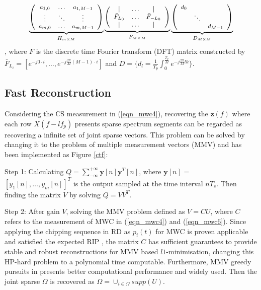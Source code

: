 \begin{align}
\label{eqn_mwc6}
\underbrace{\left(\footnotesize
\begin{array}[c]{ccc}
a_{1,0}&\ldots &a_{1,M-1} \\
\vdots &\ddots & \vdots \\
a_{m,0}&\ldots &a_{m,M-1}
\end{array}\right)}_{H_{m \times M}}
\underbrace{\left(\small
\begin{array}[c]{ccc}
| & \ldots & | \\
\bar F_{L_0} & \ldots &  \bar F_{-L_0}\\   
| & \ldots & |
\end{array}\right)}_{F_{M \times M}}
\underbrace{\left(\footnotesize
\begin{array}[c]{ccc}
d_{0}&& \\
&\ddots &  \\
&&d_{M-1}   
\end{array}\right)}_{D_{M \times M}}
\end{align}
, where $F$ is the discrete time Fourier transform (DFT) matrix constructed by $\bar F_{L_i} = [e^{-j0\cdot i},\ldots, e^{-j \frac{2\pi}{M} (M-1)\cdot i}]$ and $D = \{d_l = \frac{1}{T_p} \int_{0}^{\frac{T_p}{M}} e^{-j \frac{2\pi}{M} lk}\}$.

\subsection{Fast Reconstruction}

Considering the CS measurement in (\ref{eqn_mwc4}), recovering the $\mathbf z(f)$ where each row $X(f-lf_p)$ presents sparse spectrum segments can be regarded as recovering a infinite set of joint sparse vectors. This problem can be solved by changing it to the problem of multiple measurement vectors (MMV)\cite{mishali2008reduce} and has been implemented as Figure \ref{ctf}:

Step 1: Calculating $Q = \sum_{-\infty}^{+\infty}\mathbf y[n]\mathbf y^{T}[n]$, where $\mathbf y[n]$ = $[y_1[n],\ldots,y_m[n]]^{T}$ is the output sampled at the time interval $nT_s$. Then finding the matrix $V$ by solving $Q = VV^T$.

Step 2: After gain $V$, solving the MMV problem defined as $V = CU$, where $C$ refers to the measurement of MWC in (\ref{eqn_mwc4}) and (\ref{eqn_mwc6}). Since applying the chipping sequence in RD \cite{mishali2010theory} as $p_i(t)$ for MWC is proven applicable and satisfied the expected RIP \cite{mishali2009expected}, the matrix $C$ has sufficient guarantees to provide stable and robust reconstructions for MMV based $l1$-minimisation\cite{mishali2008reduce}, changing this HP-hard problem to a polynomial time computable. Furthermore, MMV greedy pursuits  in\cite{chen2006theoretical,mishali2008reduce,sun2009efficient} presents better computational performance and widely used. Then the joint sparse $\Omega$ is recovered as $\Omega = \cup_{i \in \Omega} supp(U)$.

